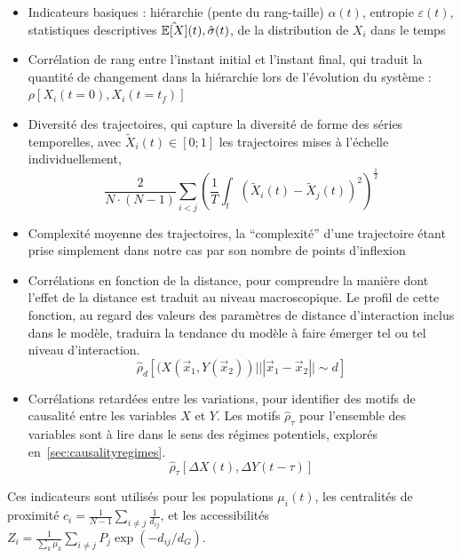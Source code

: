 \begin{itemize}
  \item Indicateurs basiques : hiérarchie (pente du rang-taille) $\alpha (t)$, entropie $\varepsilon (t)$, statistiques descriptives $\hat{\operatorname{\mathbb{E}}\!\left[X\right]} (t), \hat{\sigma} (t)$, de la distribution de $X_i$ dans le temps
  \item Corrélation de rang entre l'instant initial et l'instant final, qui traduit la quantité de changement dans la hiérarchie lors de l'évolution du système : $\rho\left[X_i(t=0),X_i(t=t_f)\right]$
  \item Diversité des trajectoires, qui capture la diversité de forme des séries temporelles, avec $\tilde{X}_i(t)\in \left[0;1\right]$ les trajectoires mises à l'échelle individuellement,
\[
\frac{2}{N\cdot(N-1)}\sum_{i<j} \left(\frac{1}{T}\int_{t} \left(\tilde{X}_i(t) - \tilde{X}_j(t)\right)^2 \right)^{\frac{1}{2}}
\]
\item Complexité moyenne des trajectoires, la ``complexité'' d'une trajectoire étant prise simplement dans notre cas par son nombre de points d'inflexion 
\item Corrélations en fonction de la distance, pour comprendre la manière dont l'effet de la distance est traduit au niveau macroscopique. Le profil de cette fonction, au regard des valeurs des paramètres de distance d'interaction inclus dans le modèle, traduira la tendance du modèle à faire émerger tel ou tel niveau d'interaction.
\[
\hat{\rho}_d\left[(X(\vec{x}_1,Y(\vec{x}_2))|||\vec{x}_1-\vec{x}_2||\sim d\right]
\]
\item Corrélations retardées entre les variations, pour identifier des motifs de causalité entre les variables $X$ et $Y$. Les motifs $\hat{\rho}_{\tau}$ pour l'ensemble des variables sont à lire dans le sens des régimes potentiels, explorés en~\ref{sec:causalityregimes}.
\[
\hat{\rho}_{\tau}\left[\Delta X(t),\Delta Y(t-\tau)\right]
\]
\end{itemize}

Ces indicateurs sont utilisés pour les populations $\mu_i(t)$, les centralités de proximité $c_i = \frac{1}{N-1}\sum_{i\neq j} \frac{1}{d_{ij}}$, et les accessibilités $Z_i = \frac{1}{\sum_k \mu_k}\sum_{i\neq j} P_j \exp{\left(- d_{ij}/d_G\right)}$.




